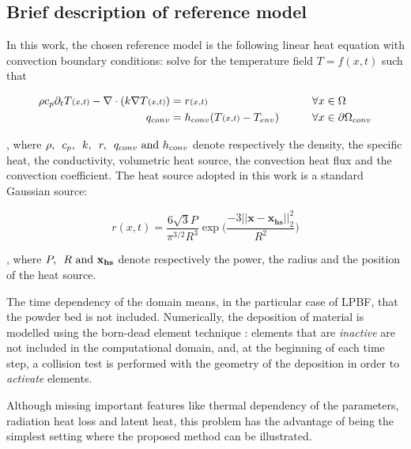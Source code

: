 \subsection{Brief description of reference model}

In this work, the chosen reference model is
the following linear heat equation with convection
boundary conditions: solve for the temperature
field $T = f(x,t)$ such that

\begin{align}
  \rho c_p \partial_t T{\scriptstyle(x,t)} - \nabla \cdot (k \nabla T{\scriptstyle(x,t)}) &= r{\scriptstyle(x,t)}
  \qquad &\forall x &\in \Omega \label{eq:refheateq}\\
  q_{conv} &= h_{conv} ( T{\scriptstyle(x,t)} - T_{env} ) \qquad & \forall x &\in \partial \Omega {}_{conv}\notag
\end{align}

, where $\rho, \enskip c_p, \enskip k, \enskip  r, \enskip q_{conv} \textrm{ and } h_{conv}$
denote respectively
the density, the specific heat, the conductivity, volumetric
heat source, the convection heat flux and the convection coefficient.
The heat source adopted in this work is a standard Gaussian source:

\begin{equation}\label{eq:heatsource}
  r(x, t) = \frac{6 \sqrt{3} P}{ \pi^{3/2} R^3}
  \exp\bigg( \frac{-3||\mathbf{x} - \mathbf{x_{hs}}||_2^2}{R^2}\bigg)
\end{equation}

, where $P, \enskip R \textrm{ and } \mathbf{x_{hs}}$
denote respectively the power, the radius and the position
of the heat source.\par

The time dependency of the domain means, in the particular case
of LPBF, 
that the powder bed is not included.
Numerically, the deposition of material
is modelled using  the born-dead element
technique \cite{Chiumenti2010}:
elements that are \textit{inactive} are not included in the
computational domain,
and, at the beginning of each time step, a collision test
is performed with the geometry of the deposition
in order to \textit{activate} elements.\par

Although missing important features like
thermal dependency of the parameters, radiation heat loss and
latent heat\cite{VanElsen2007, Hodge2021}, this problem
has the advantage of being the simplest setting where
the proposed method can be illustrated.\par

